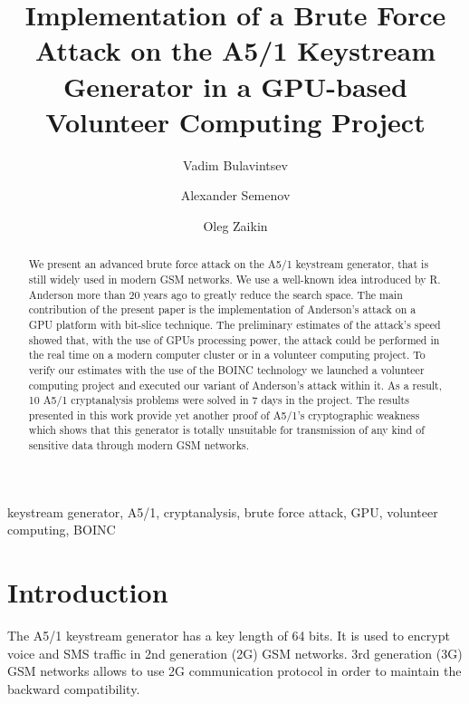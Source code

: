 \documentclass[runningheads,a4paper]{llncs}[2015/06/24]
\begin{document}
\title{Implementation of a Brute Force Attack on the A5/1 Keystream Generator
in a GPU-based Volunteer Computing Project}

\author{Vadim Bulavintsev \and Alexander Semenov \and Oleg Zaikin}
			
\maketitle

\begin{abstract}
We present an advanced brute force attack on the A5/1 keystream generator,
that is still widely used in modern GSM networks. We use a
well-known idea introduced by R. Anderson more than 20 years ago
to greatly reduce the search space. The main contribution of
the present paper is the implementation of Anderson's attack on a GPU platform
with bit-slice technique. The preliminary estimates of the
attack's speed showed that, with the use of GPUs processing power, 
the attack could be performed in the real time on a modern computer cluster or in a volunteer computing
project. To verify our estimates with the use of the BOINC technology 
we launched a volunteer computing project and executed our variant of Anderson's attack within it. 
As a result, 10 A5/1 cryptanalysis problems were solved in 7 days in the project. 
The results presented in this work provide yet another proof of A5/1's cryptographic 
weakness which shows that this generator is totally unsuitable for transmission of any kind of sensitive data
through modern GSM networks.
\end{abstract}

\begin{keywords}
keystream generator, A5/1, cryptanalysis, brute force attack, GPU, volunteer computing, BOINC
\end{keywords}

\section{Introduction}
\label{sec:intro}

The A5/1 keystream generator has a key length of 64 bits. It is used
to encrypt voice and SMS traffic in 2nd generation (2G) GSM networks. 3rd
generation (3G) GSM networks allows to use 2G communication protocol in order to maintain the backward
compatibility.
\end{document}
